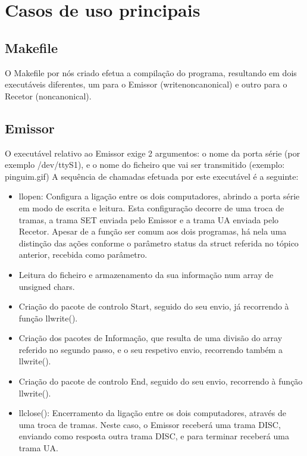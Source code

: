 \documentclass[article, a4paper, 11pt, oneside]{memoir}
\begin{document}
\chapter[Casos de uso principais][Casos de uso principais]{Casos de uso principais} \label{\thechapter}

\section{Makefile}
O Makefile por nós criado efetua a compilação do programa, resultando em dois executáveis diferentes, um para o Emissor (writenoncanonical) 
e outro para o Recetor (noncanonical).

\section{Emissor}
O executável relativo ao Emissor exige 2 argumentos: o nome da porta série (por exemplo /dev/ttyS1), e o nome do ficheiro que vai ser transmitido (exemplo: pinguim.gif)
A sequência de chamadas efetuada por este executável é a seguinte:
\begin{itemize}
	\item llopen: Configura a ligação entre os dois computadores, abrindo a porta série em modo de escrita e leitura. Esta configuração decorre de uma troca de tramas, a trama SET enviada pelo Emissor e a trama UA enviada pelo Recetor. Apesar de a função ser comum aos dois programas, há nela uma distinção das ações conforme o parâmetro status da struct referida no tópico anterior, recebida como parâmetro.
	\item Leitura do ficheiro e armazenamento da sua informação num array de unsigned chars.
	\item Criação do pacote de controlo Start, seguido do seu envio, já recorrendo à função llwrite().
	\item Criação dos pacotes de Informação, que resulta de uma divisão do array referido no segundo passo, e o seu respetivo envio, recorrendo também a llwrite().
	\item Criação do pacote de controlo End, seguido do seu envio, recorrendo à função llwrite().
	\item llclose(): Encerramento da ligação entre os dois computadores, através de uma troca de tramas. Neste caso, o Emissor receberá uma trama DISC, enviando como resposta outra trama DISC, e para terminar receberá uma trama UA.
\end{itemize}
\end{document}
